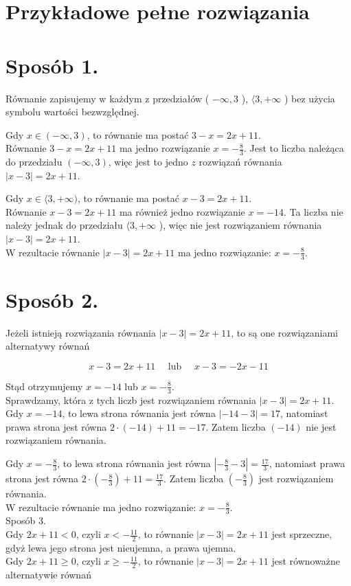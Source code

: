 \documentclass[10pt]{article}
\begin{document}
\section*{Przykładowe pełne rozwiązania}
\section*{Sposób 1.}
Równanie zapisujemy w każdym z przedziałów ( $-\infty, 3$ ), $\langle 3,+\infty$ ) bez użycia symbolu wartości bezwzględnej.

Gdy $x \in(-\infty, 3)$, to równanie ma postać $3-x=2 x+11$.\\
Równanie $3-x=2 x+11$ ma jedno rozwiązanie $x=-\frac{8}{3}$. Jest to liczba należąca do przedziału $(-\infty, 3)$, więc jest to jedno $z$ rozwiązań równania $|x-3|=2 x+11$.

Gdy $x \in\langle 3,+\infty)$, to równanie ma postać $x-3=2 x+11$.\\
Równanie $x-3=2 x+11$ ma również jedno rozwiązanie $x=-14$. Ta liczba nie należy jednak do przedziału $\langle 3,+\infty$ ), więc nie jest rozwiązaniem równania $| x-3 \mid=2 x+11$.\\
W rezultacie równanie $|x-3|=2 x+11$ ma jedno rozwiązanie: $x=-\frac{8}{3}$.

\section*{Sposób 2.}
Jeżeli istnieją rozwiązania równania $|x-3|=2 x+11$, to są one rozwiązaniami alternatywy równań

$$
x-3=2 x+11 \quad \text { lub } \quad x-3=-2 x-11
$$

Stąd otrzymujemy $x=-14$ lub $x=-\frac{8}{3}$.\\
Sprawdzamy, która z tych liczb jest rozwiązaniem równania $|x-3|=2 x+11$.\\
Gdy $x=-14$, to lewa strona równania jest równa $|-14-3|=17$, natomiast prawa strona jest równa $2 \cdot(-14)+11=-17$. Zatem liczba $(-14)$ nie jest rozwiązaniem równania.

Gdy $x=-\frac{8}{3}$, to lewa strona równania jest równa $\left|-\frac{8}{3}-3\right|=\frac{17}{3}$, natomiast prawa strona jest równa $2 \cdot\left(-\frac{8}{3}\right)+11=\frac{17}{3}$. Zatem liczba $\left(-\frac{8}{3}\right)$ jest rozwiązaniem równania.\\
W rezultacie równanie ma jedno rozwiązanie: $x=-\frac{8}{3}$.\\
Sposób 3.\\
Gdy $2 x+11<0$, czyli $x<-\frac{11}{2}$, to równanie $|x-3|=2 x+11$ jest sprzeczne, gdyż lewa jego strona jest nieujemna, a prawa ujemna.\\
Gdy $2 x+11 \geq 0$, czyli $x \geq-\frac{11}{2}$, to równanie $|x-3|=2 x+11$ jest równoważne alternatywie równań
\end{document}
